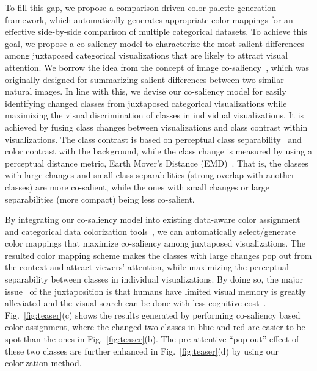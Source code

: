 To fill this gap, we propose a comparison-driven color palette generation framework, which automatically generates appropriate color mappings for an effective side-by-side comparison of multiple categorical datasets. To achieve this goal, we propose a co-saliency model to characterize the most salient differences among juxtaposed categorical visualizations that are  likely to attract visual attention. We borrow the idea from the concept of image co-saliency~\cite{Jacobs10}, which was originally designed for summarizing salient differences between two similar natural images. %
In line with this, we devise our co-saliency model for easily identifying changed classes from juxtaposed categorical visualizations while maximizing the visual discrimination of classes in individual visualizations. It is achieved by fusing  class changes between visualizations and class contrast
within visualizations. The class contrast is based on
perceptual class separability~\cite{Wang2018} and color contrast with the background, while
the class change is measured by using a perceptual distance metric,  Earth Mover's Distance (EMD)~\cite{rubner2000earth}.
That is, the classes with large changes and small class separabilities (strong overlap with another classes) are more co-salient, while the ones with small changes or large separabilities (more compact) being less co-salient.

By integrating our co-saliency model into existing data-aware color assignment and categorical data colorization tools~\cite{Wang2018, Lu21}, we can automatically select/generate color mappings that maximize co-saliency among juxtaposed visualizations. The resulted color mapping scheme makes the classes with large changes pop out from the context and attract viewers' attention,  while maximizing the perceptual separability between classes in individual visualizations. By doing so,
the major issue~\cite{Tominski12} of the juxtaposition is that humans have limited visual memory is greatly alleviated and the visual search can be done with less cognitive cost~\cite{healey1995visualizing}. Fig.~\ref{fig:teaser}(c) shows the results generated by performing co-saliency based color assignment, where the changed two classes in blue and red are easier to be spot than the ones in Fig.~\ref{fig:teaser}(b). The pre-attentive ``pop out'' effect of these two classes are further enhanced in Fig.~\ref{fig:teaser}(d) by using our colorization method.


